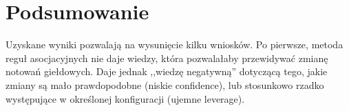 \documentclass[a4paper,10pt]{article}
\begin{document}
\section{Podsumowanie}

Uzyskane wyniki pozwalają na wysunięcie kilku wniosków. Po pierwsze, metoda reguł asocjacyjnych nie daje wiedzy, która pozwalałaby przewidywać zmianę notowań
giełdowych. Daje jednak ,,wiedzę negatywną'' dotyczącą tego, jakie zmiany są mało prawdopodobne (niskie confidence), lub stosunkowo rzadko występujące w określonej
 konfiguracji (ujemne leverage).
\end{document}
